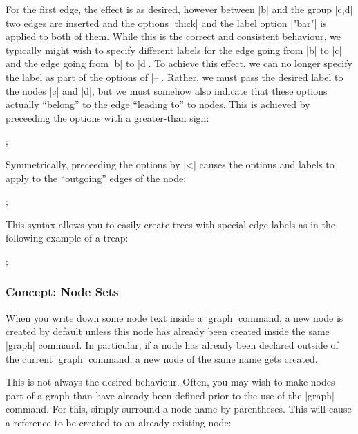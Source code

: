 For the first edge, the effect is as desired, however 
between |b| and the group |{c,d}| two edges are inserted and the
options |thick| and the label option |"bar"| is applied to both of
them. While this is the correct and consistent behaviour, we typically
might wish to specify different labels for the edge going from |b| to
|c| and the edge going from |b| to |d|. To achieve this effect, we can
no longer specify the label as part of the options of |--|. Rather, we
must pass the desired label to the nodes |c| and |d|, but we must
somehow also indicate that these options actually ``belong'' to the
edge ``leading to'' to nodes. This is achieved by preceeding the
options with a greater-than sign:

\begin{codeexample}[]
\tikz {};
\end{codeexample}

Symmetrically, preceeding the options by |<| causes the options and
labels to apply to the ``outgoing'' edges of the node:

\begin{codeexample}[]
\tikz {};
\end{codeexample}

This syntax allows you to easily create trees with special edge
labels as in the following example of a treap:

\begin{codeexample}[]
\tikz 
  ;
\end{codeexample}



\subsubsection{Concept: Node Sets}

When you write down some node text inside a |graph| command, a new
node is created by default unless this node has already been created
inside the same |graph| command. In particular, if a node has
already been declared outside of the current |graph| command, a new
node of the same name gets created.

This is not always the desired behaviour. Often, you may wish to make
nodes part of a graph than have already been defined prior to the use
of the |graph| command. For this, simply surround a node name by
parentheses. This will cause a reference to be created to an already
existing node:

